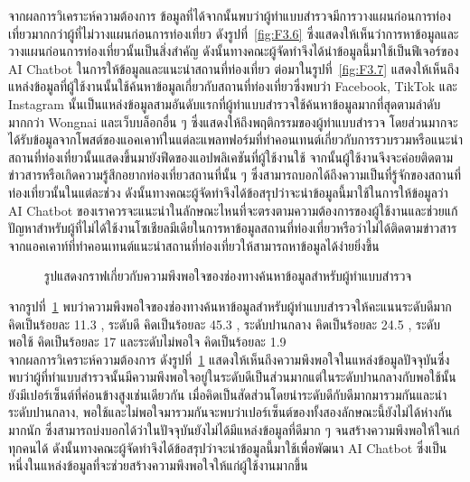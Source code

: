 \documentclass[12pt,oneside,openright,a4paper]{cpe-thai-project}
\begin{document}
จากผลการวิเคราะห์ความต้องการ ข้อมูลที่ได้จากนั้นพบว่าผู้ทำแบบสำรวจมีการวางแผนก่อนการท่องเที่ยวมากกว่าผู้ที่ไม่วางแผนก่อนการท่องเที่ยว ดังรูปที่~\ref{fig:F3.6} ซึ่งแสดงให้เห็นว่าการหาข้อมูลและวางแผนก่อนการท่องเที่ยวนั้นเป็นสิ่งสำคัญ ดังนั้นทางคณะผู้จัดทำจึงได้นำข้อมูลนี้มาใช้เป็นฟีเจอร์ของ AI Chatbot ในการให้ข้อมูลและแนะนำสถานที่ท่องเที่ยว ต่อมาในรูปที่~\ref{fig:F3.7} แสดงให้เห็นถึงแหล่งข้อมูลที่ผู้ใช้งานนั้นใช้ค้นหาข้อมูลเกี่ยวกับสถานที่ท่องเที่ยวซึ่งพบว่า Facebook, TikTok และ Instagram นั้นเป็นแหล่งข้อมูลสามอันดับแรกที่ผู้ทำแบบสำรวจใช้ค้นหาข้อมูลมากที่สุดตามลำดับมากกว่า Wongnai และเว็บบล็อกอื่น ๆ ซึ่งแสดงให้ถึงพฤติกรรมของผู้ทำแบบสำรวจ โดยส่วนมากจะได้รับข้อมูลจากโพสต์ของแอคเคาท์ในแต่ละแพลทฟอร์มที่ทำคอนเทนต์เกี่ยวกับการรวบรวมหรือแนะนำสถานที่ท่องเที่ยวนั้นแสดงขึ้นมายังฟีดของแอปพลิเคชันที่ผู้ใช้งานใช้ จากนั้นผู้ใช้งานจึงจะค่อยติดตามข่าวสารหรือเกิดความรู้สึกอยากท่องเที่ยวสถานที่นั้น ๆ ซึ่งสามารถบอกได้ถึงความเป็นที่รู้จักของสถานที่ท่องเที่ยวนั้นในแต่ละช่วง ดังนั้นทางคณะผู้จัดทำจึงได้ข้อสรุปว่าจะนำข้อมูลนี้มาใช้ในการให้ข้อมูลว่า AI Chatbot ของเราควรจะแนะนำในลักษณะไหนที่จะตรงตามความต้องการของผู้ใช้งานและช่วยแก้ปัญหาสำหรับผู้ที่ไม่ได้ใช้งานโซเชียลมีเดียในการหาข้อมูลสถานที่ท่องเที่ยวหรือว่าไม่ได้ติดตามข่าวสารจากแอคเคาท์ที่ทำคอนเทนต์แนะนำสถานที่ท่องเที่ยวให้สามารถหาข้อมูลได้ง่ายยิ่งขึ้น \\

\begin{figure}[!h]\centering
\setlength{\fboxrule}{0mm}
\caption{รูปแสดงกราฟเกี่ยวกับความพึงพอใจของช่องทางค้นหาข้อมูลสำหรับผู้ทำแบบสำรวจ}\label{fig:F3.8}
\end{figure}
จากรูปที่~\ref{fig:F3.8} พบว่าความพึงพอใจของช่องทางค้นหาข้อมูลสำหรับผู้ทำแบบสำรวจให้คะแนนระดับดีมาก คิดเป็นร้อยละ 11.3 , ระดับดี คิดเป็นร้อยละ 45.3 , ระดับปานกลาง คิดเป็นร้อยละ 24.5 , ระดับพอใช้ คิดเป็นร้อยละ 17 และระดับไม่พอใจ คิดเป็นร้อยละ 1.9 \\

จากผลการวิเคราะห์ความต้องการ ดังรูปที่~\ref{fig:F3.8} แสดงให้เห็นถึงความพึงพอใจในแหล่งข้อมูลปัจจุบันซึ่งพบว่าผู้ที่ทำแบบสำรวจนั้นมีความพึงพอใจอยู่ในระดับดีเป็นส่วนมากแต่ในระดับปานกลางกับพอใช้นั้นยังมีเปอร์เซ็นต์ที่ค่อนข้างสูงเช่นเดียวกัน เมื่อคิดเป็นสัดส่วนโดยนำระดับดีกับดีมากมารวมกันและนำระดับปานกลาง, พอใช้และไม่พอใจมารวมกันจะพบว่าเปอร์เซ็นต์ของทั้งสองลักษณะนี้ยังไม่ได้ห่างกันมากนัก ซึ่งสามารถบ่งบอกได้ว่าในปัจจุบันยังไม่ได้มีแหล่งข้อมูลที่ดีมาก ๆ จนสร้างความพึงพอให้ใจแก่ทุกคนได้ ดังนั้นทางคณะผู้จัดทำจึงได้ข้อสรุปว่าจะนำข้อมูลนี้มาใช้เพื่อพัฒนา AI Chatbot ซึ่งเป็นหนึ่งในแหล่งข้อมูลที่จะช่วยสร้างความพึงพอใจให้แก่ผู้ใช้งานมากขึ้น \newpage
\end{document}
